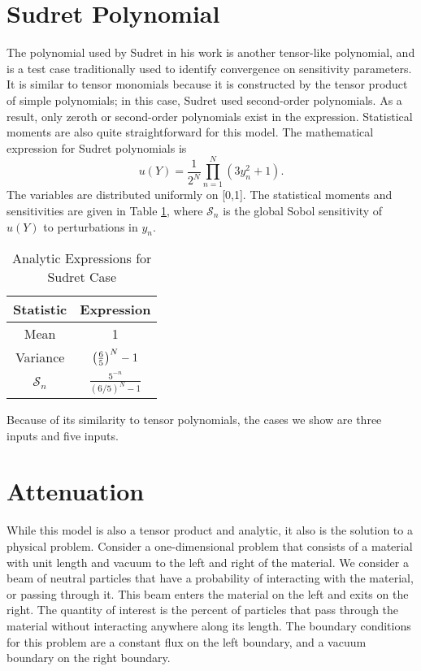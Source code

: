 \section{Sudret Polynomial}\label{mod:sudret}
The polynomial used by Sudret in his work \cite{sudret} is another tensor-like polynomial, and is a test case traditionally used to
identify convergence on sensitivity parameters.  It is similar to tensor monomials because it is constructed by the tensor
product of simple polynomials; in this case, Sudret used second-order polynomials.  As a result, only zeroth or second-order
polynomials exist in the expression.  Statistical moments are also quite straightforward for this model.
The mathematical expression for Sudret polynomials is
\begin{equation}
  u(Y) = \frac{1}{2^N}\prod_{n=1}^N (3y_n^2+1).
\end{equation}
The variables are distributed uniformly on [0,1].  The statistical moments and sensitivities are given in
Table \ref{tab:sudret}, where $\mathcal{S}_n$ is the global Sobol sensitivity of $u(Y)$ to perturbations in
$y_n$.

\begin{table}[H]
  \centering
  \begin{tabular}{c c}
    Statistic & Expression \\\hline
    Mean & 1 \\
    Variance & $\qty(\frac{6}{5})^N - 1$ \\
    $\mathcal{S}_n$ & $\frac{5^{-n}}{(6/5)^N-1}$
  \end{tabular}
  \caption{Analytic Expressions for Sudret Case}
  \label{tab:sudret}
\end{table}
Because of its similarity to tensor polynomials, the cases we show are three inputs and five inputs.

\section{Attenuation}\label{mod:attenuation}
While this model is also a tensor product and analytic, it also is the solution to a physical problem.
Consider a one-dimensional problem that consists of a material with unit length and vacuum to the left and
right of the material.  We consider a beam of neutral particles that have a probability of interacting
with the material, or passing through it.  This beam enters the material on the left and exits on the right.
The quantity of interest is the percent of particles that pass through the material without interacting
anywhere along its length.  The boundary conditions for this problem are a constant flux on the left boundary,
and a vacuum boundary on the right boundary.

